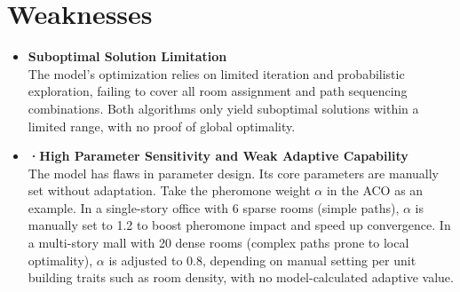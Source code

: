 \section{Weaknesses}
\begin{itemize}
    \item \textbf{Suboptimal Solution Limitation} \\
    The model's optimization relies on limited iteration and probabilistic exploration, failing to cover all room assignment and path sequencing combinations. Both algorithms only yield suboptimal solutions within a limited range, with no proof of global optimality.

    \item \textbf{·High Parameter Sensitivity and Weak Adaptive Capability  } \\
The model has flaws in parameter design. Its core parameters are manually set without adaptation. Take the pheromone weight $\alpha$ in the ACO as an example. In a single-story office with 6 sparse rooms (simple paths), $\alpha$ is manually set to 1.2 to boost pheromone impact and speed up convergence. In a multi-story mall with 20 dense rooms (complex paths prone to local optimality), $\alpha$ is adjusted to 0.8, depending on manual setting per unit building traits such as room density, with no model-calculated adaptive value.
\end{itemize}






